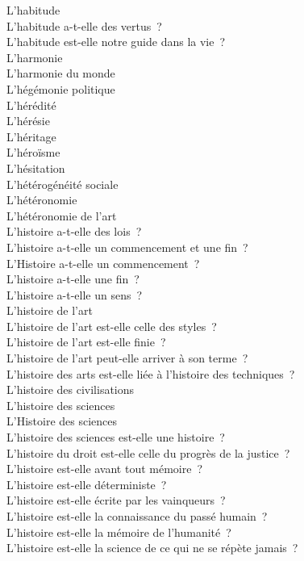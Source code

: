 \documentclass[a4paper,12pt]{article}
\begin{document}
L'habitude \\
L'habitude a-t-elle des vertus ? \\
L'habitude est-elle notre guide dans la vie ? \\
L'harmonie \\
L'harmonie du monde \\
L'hégémonie politique \\
L'hérédité \\
L'hérésie \\
L'héritage \\
L'héroïsme \\
L'hésitation \\
L'hétérogénéité sociale \\
L'hétéronomie \\
L'hétéronomie de l'art \\
L'histoire a-t-elle des lois ? \\
L'histoire a-t-elle un commencement et une fin ? \\
L'Histoire a-t-elle un commencement ? \\
L'histoire a-t-elle une fin ? \\
L'histoire a-t-elle un sens ? \\
L'histoire de l'art \\
L'histoire de l'art est-elle celle des styles ? \\
L'histoire de l'art est-elle finie ? \\
L'histoire de l'art peut-elle arriver à son terme ? \\
L'histoire des arts est-elle liée à l'histoire des techniques ? \\
L'histoire des civilisations \\
L'histoire des sciences \\
L'Histoire des sciences \\
L'histoire des sciences est-elle une histoire ? \\
L'histoire du droit est-elle celle du progrès de la justice ? \\
L'histoire est-elle avant tout mémoire ? \\
L'histoire est-elle déterministe ? \\
L'histoire est-elle écrite par les vainqueurs ? \\
L'histoire est-elle la connaissance du passé humain ? \\
L'histoire est-elle la mémoire de l'humanité ? \\
L'histoire est-elle la science de ce qui ne se répète jamais ? \\
\end{document}

